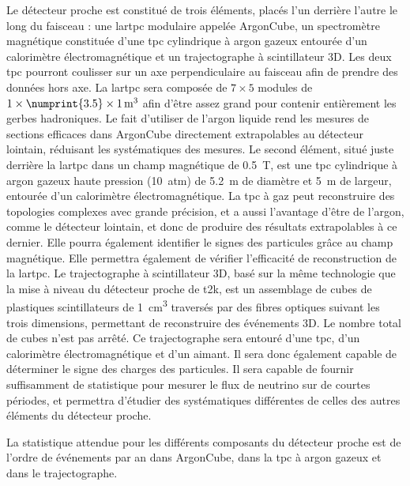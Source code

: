      Le détecteur proche est constitué de trois éléments, placés l'un derrière l'autre le long du faisceau : une \gls{lartpc} modulaire appelée ArgonCube, un spectromètre magnétique constituée d'une \gls{tpc} cylindrique à argon gazeux entourée d'un calorimètre électromagnétique et un trajectographe à scintillateur 3D. Les deux \gls{tpc} pourront coulisser sur un axe perpendiculaire au faisceau afin de prendre des données hors axe. La \gls{lartpc} sera composée de $7\times5$ modules de $1\times\numprint{3.5}\times\SI{1}{\meter\cubed}$ afin d'être assez grand pour contenir entièrement les gerbes hadroniques. Le fait d'utiliser de l'argon liquide rend les mesures de sections efficaces dans ArgonCube directement extrapolables au détecteur lointain, réduisant les systématiques des mesures. Le second élément, situé juste derrière la \gls{lartpc} dans un champ magnétique de \SI{0.5}{\tesla}, est une \gls{tpc} cylindrique à argon gazeux haute pression (\SI{10}{atm}) de \SI{5.2}{\meter} de diamètre et \SI{5}{\meter} de largeur, entourée d'un calorimètre électromagnétique. La \gls{tpc} à gaz peut reconstruire des topologies complexes avec grande précision, et a aussi l'avantage d'être de l'argon, comme le détecteur lointain, et donc de produire des résultats extrapolables à ce dernier. Elle pourra également identifier le signes des particules grâce au champ magnétique. Elle permettra également de vérifier l'efficacité de reconstruction de la \gls{lartpc}. Le trajectographe à scintillateur 3D, basé sur la même technologie que la mise à niveau du détecteur proche de \gls{t2k}, est un assemblage de cubes de plastiques scintillateurs de \SI{1}{\centi\meter\cubed} traversés par des fibres optiques suivant les trois dimensions, permettant de reconstruire des événements 3D. Le nombre total de cubes n'est pas arrêté. Ce trajectographe sera entouré d'une \gls{tpc}, d'un calorimètre électromagnétique et d'un aimant. Il sera donc également capable de déterminer le signe des charges des particules. Il sera capable de fournir suffisamment de statistique pour mesurer le flux de neutrino sur de courtes périodes, et permettra d'étudier des systématiques différentes de celles des autres éléments du détecteur proche.

      La statistique attendue pour les différents composants du détecteur proche est de l'ordre de  événements par an dans ArgonCube,  dans la \gls{tpc} à argon gazeux et  dans le trajectographe.

